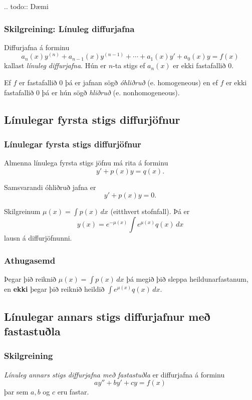 \documentclass[icelandic,a4paper,12pt]{article}
\begin{document}
.. todo::
  Dæmi

\subsubsection{Skilgreining: Línuleg diffurjafna} 
Diffurjafna á forminu
$$a_n(x)y^{(n)}+a_{n-1}(x)y^{(n-1)}+\cdots+a_1(x)y'+a_0(x)y=f(x)$$
kallast \emph{línuleg diffurjafna}. 
Hún er $n$-ta stigs ef $a_n(x)$ er
ekki fastafallið $0$.  

Ef $f$ er fastafallið $0$ þá er jafnan sögð
\emph{óhliðruð} (e. homogeneous)  en ef $f$ er ekki fastafallið $0$ þá
er hún sögð \emph{hliðruð} (e. nonhomogeneous). 

\subsection{Línulegar fyrsta stigs diffurjöfnur}
\subsubsection{Línulegar fyrsta stigs diffurjöfnur}
Almenna línulega fyrsta stigs jöfnu má rita á forminu
$$y'+p(x)y=q(x).$$

Samsvarandi óhliðruð jafna er $$y'+p(x)y=0.$$

Skilgreinum $\mu(x)=\int p(x)\,dx$ (eitthvert stofnfall).  Þá er 
$$y(x)=e^{-\mu(x)}\int e^{\mu(x)}q(x)\,dx$$
lausn á diffurjöfnunni.  

\subsubsection{Athugasemd}
Þegar þið reiknið $\mu(x)=\int p(x)\,dx$ þá
megið þið sleppa heildunarfastanum, en \textbf{ekki} þegar þið reiknið heildið 
$\int e^{\mu(x)}q(x)\,dx$.


\subsection{Línulegar annars stigs diffurjafnur með fastastuðla}
\subsubsection{Skilgreining}  
\emph{Línuleg annars stigs diffurjafna með
fastastuðla} er diffurjafna á forminu 
$$ay''+by'+cy=f(x)$$
þar sem $a, b$ og $c$ eru fastar. 
\end{document}
